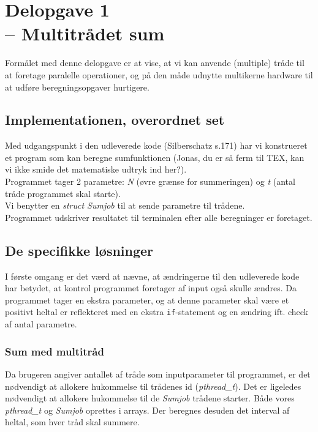 \documentclass[main.tex]{subfile}
\begin{document}
\section{Delopgave 1\\\normalsize{-- Multitrådet sum}}
Formålet med denne delopgave er at vise, at vi kan anvende (multiple) tråde til at foretage paralelle operationer, og på den måde udnytte multikerne hardware til at udføre beregningsopgaver hurtigere.

\subsection{Implementationen, overordnet set}
Med udgangspunkt i den udleverede kode (Silberschatz s.171) har vi konstrueret et program som kan beregne sumfunktionen (Jonas, du er så ferm til TEX, kan vi ikke smide det matematiske udtryk ind her?).\\

Programmet tager 2 parametre: \textit{N} (øvre grænse for summeringen) og \textit{t} (antal tråde programmet skal starte).\\

Vi benytter en \textit{struct Sumjob} til at sende parametre til trådene.\\

Programmet udskriver resultatet til terminalen efter alle beregninger er foretaget.

\subsection{De specifikke løsninger}
I første omgang er det værd at nævne, at ændringerne til den udleverede kode har betydet, at kontrol programmet foretager af input også skulle ændres. Da programmet tager en ekstra parameter, og at denne parameter skal være et positivt heltal er reflekteret med en ekstra \texttt{if}-statement og en ændring ift. check af antal parametre.

\subsubsection{Sum med multitråd}
Da brugeren angiver antallet af tråde som inputparameter til programmet, er det nødvendigt at allokere hukommelse til trådenes id (\textit{pthread_t}). Det er ligeledes nødvendigt at allokere hukommelse til de \textit{Sumjob} trådene starter. Både vores \textit{pthread_t} og \textit{Sumjob} oprettes i arrays. Der beregnes desuden det interval af heltal, som hver tråd skal summere.\\ 
\end{document}

